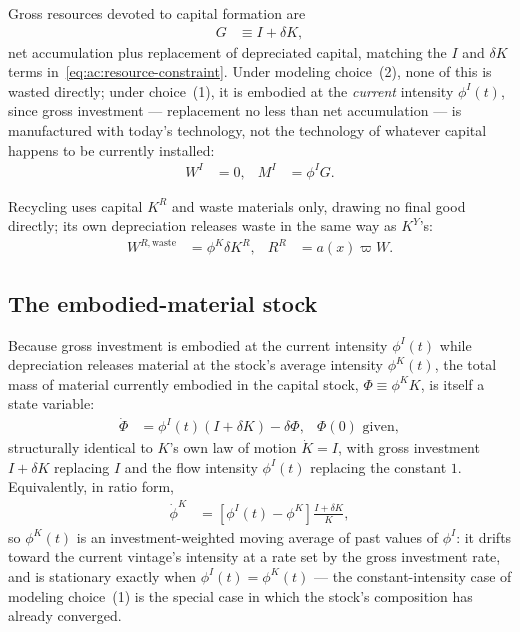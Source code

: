  Gross resources devoted to capital formation are
\begin{align}
G &\equiv I+\delta K,
\label{eq:ac:gross-formation}
\end{align}
net accumulation plus replacement of depreciated capital, matching the $I$ and $\delta K$ terms in~\eqref{eq:ac:resource-constraint}. Under modeling choice~(2), none of this is wasted directly; under choice~(1), it is embodied at the \emph{current} intensity $\phi^I(t)$, since gross investment --- replacement no less than net accumulation --- is manufactured with today's technology, not the technology of whatever capital happens to be currently installed:
\begin{align}
W^I &= 0, & M^I &= \phi^IG.
\label{eq:ac:investment}
\end{align}

 Recycling uses capital $K^R$ and waste materials only, drawing no final good directly; its own depreciation releases waste in the same way as $K^Y$'s:
\begin{align}
W^{R,\text{waste}} &= \phi^K\delta K^R, & R^R &= a\!\left(x\right)\varpi W.
\label{eq:ac:recycling-mass}
\end{align}

\subsection{The embodied-material stock}
\label{subsec:ac:embodied-stock}

Because gross investment is embodied at the current intensity $\phi^I(t)$ while depreciation releases material at the stock's average intensity $\phi^K(t)$, the total mass of material currently embodied in the capital stock, $\Phi\equiv\phi^KK$, is itself a state variable:
\begin{align}
\dot\Phi &= \phi^I(t)\left(I+\delta K\right)-\delta\Phi,
&
\Phi(0) \text{ given},
\label{eq:ac:Phi-motion}
\end{align}
structurally identical to $K$'s own law of motion $\dot K=I$, with gross investment $I+\delta K$ replacing $I$ and the flow intensity $\phi^I(t)$ replacing the constant $1$. Equivalently, in ratio form,
\begin{align}
\dot\phi^K &= \left[\phi^I(t)-\phi^K\right]\frac{I+\delta K}{K},
\label{eq:ac:phiK-motion}
\end{align}
so $\phi^K(t)$ is an investment-weighted moving average of past values of $\phi^I$: it drifts toward the current vintage's intensity at a rate set by the gross investment rate, and is stationary exactly when $\phi^I(t)=\phi^K(t)$ --- the constant-intensity case of modeling choice~(1) is the special case in which the stock's composition has already converged.

